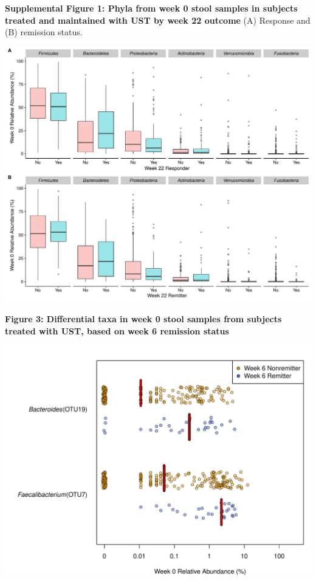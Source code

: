 \documentclass[11pt,]{article}
\begin{document}
\textbf{Supplemental Figure 1: Phyla from week 0 stool samples in
subjects treated and maintained with UST by week 22 outcome} (A)
Response and (B) remission status.

\includegraphics{figures/SF1_phylaWK22.pdf}

\newpage

\textbf{Figure 3: Differential taxa in week 0 stool samples from
subjects treated with UST, based on week 6 remission status}

\includegraphics{figures/Figure3_basesigOTUabund.REMISSwk6.pdf}

\newpage
\end{document}
